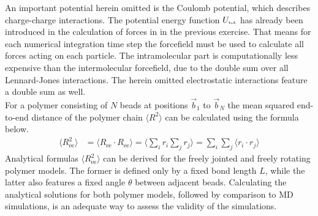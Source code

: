\documentclass[9pt,tutorial]{livecoms}
\begin{document}
An important potential herein omitted is the Coulomb potential, which describes charge-charge interactions. The potential energy function $U_\text{\tiny tot}$ has already been introduced in the calculation of forces in  in the previous exercise. That means for each numerical integration time step the forcefield must be used to calculate all forces acting on each particle. The intramolecular part is computationally less expensive than the intermolecular forcefield, due to the double sum over all Lennard-Jones interactions. The herein omitted electrostatic interactions feature a double sum as well.\\
For a polymer consisting of $N$ beads at positions $\vec{b}_{1}$ to $\vec{b}_N$ the mean squared end-to-end distance of the polymer chain $\langle R^2 \rangle$ can be calculated using the formula below.
\begin{align}\label{eq:Re2e}
	\langle R_\text{ee}^2 \rangle &= \langle R_\text{ee} \cdot R_\text{ee} \rangle = \langle \sum_i r_i \sum_j r_j \rangle = \sum_i \sum_j \langle  r_i \cdot r_j \rangle 
\end{align}
Analytical formulas $\langle R_\text{ee}^2 \rangle$ can be derived for the freely jointed and freely rotating polymer models. The former is defined only by a fixed bond length $L$, while the latter also features a fixed angle $\theta$ between adjacent beads. Calculating the analytical solutions for both polymer models, followed by comparison to MD simulations, is an adequate way to assess the validity of the simulations.
\end{document}
